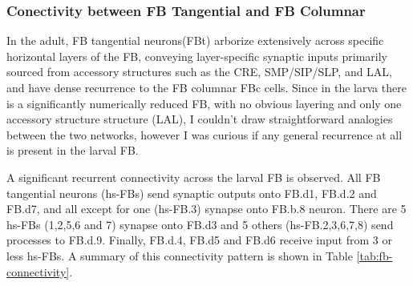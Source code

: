         \subsubsection{Conectivity between FB Tangential and FB Columnar}
           In the adult, FB tangential neurons(FBt) arborize extensively across specific horizontal layers of the FB, conveying layer-specific synaptic inputs primarily sourced from accessory structures such as the CRE, SMP/SIP/SLP, and LAL, and have dense recurrence to the FB columnar FBc cells. Since in the larva there is a significantly numerically reduced FB, with no obvious layering and only one accessory structure structure (LAL), I couldn't draw straightforward analogies between the two networks, however I was curious if any general recurrence at all is present in the larval FB.  
           
           A significant recurrent connectivity across the larval FB is observed. All FB tangential neurons (hs-FBs) send synaptic outputs onto FB.d1, FB.d.2 and FB.d7, and all except for one (hs-FB.3) synapse onto FB.b.8 neuron. There are 5 hs-FBs (1,2,5,6 and 7) synapse onto FB.d3 and 5 others (hs-FB.2,3,6,7,8) send processes to FB.d.9. Finally, FB.d.4, FB.d5 and FB.d6 receive input from 3 or less hs-FBs. A summary of this connectivity pattern is shown in Table \ref{tab:fb-connectivity}.
        

